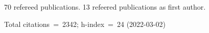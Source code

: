 70 refereed publications. 13 refeered publications as first author.

Total citations~=~2342; h-index~=~24 (2022-03-02)